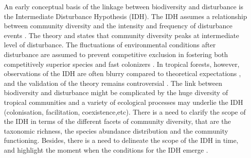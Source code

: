 \documentclass[fleqn,10pt]{ArtEcoFoG} %
\begin{document}
An early conceptual basis of the linkage between biodiversity and
disturbance is the Intermediate Disturbance Hypothesis (IDH). The IDH
assumes a relationship between community diversity and the intensity and
frequency of disturbance events \citep{Connell1978}. The theory and
states that community diversity peaks at intermediate level of
disturbance. The fluctuations of environmental conditions after
disturbance are assumed to prevent competitive exclusion in fostering
both competitively superior species and fast colonizers
\citep{Shea2004, Pulsford2016}. In tropical forests, however,
observations of the IDH are often blurry compared to theoretical
expectations \citep{Hugues2007, Sheil2003, Norden2017}, and the
validation of the theory remains controversial
\citep{Hubbell2001, Fox2013, Sheil2013}. The link between biodiversity
and disturbance might be complicated by the huge diversity of tropical
communities and a variety of ecological processes may underlie the IDH
(colonisation, facilitation,
coexistence,etc)\citep{Lindenmayer2012, Garcia_florez2017}. There is a
need to clarify the scope of the IDH in terms of the different facets of
community diversity, that are the taxonomic richness, the species
abundance distribution and the community functioning. Besides, there is
a need to delineate the scope of the IDH in time, and highlight the
moment when the conditions for the IDH emerge
\citep{Sheil2003, Shea2004}.
\end{document}
